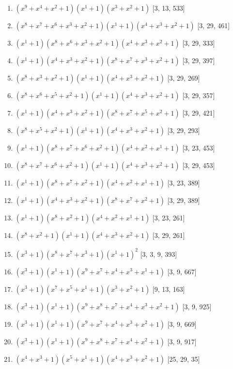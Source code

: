 \documentclass[10pt,twocolumn]{article}
\begin{document}
\begin{enumerate}
\item $(x^{9} + x^{4} + x^{2} + 1)(x^{1} + 1)(x^{3} + x^{2} + 1)$  [3, 13, 533]
\item $(x^{8} + x^{7} + x^{6} + x^{3} + x^{2} + 1)(x^{1} + 1)(x^{4} + x^{3} + x^{2} + 1)$  [3, 29, 461]
\item $(x^{1} + 1)(x^{8} + x^{6} + x^{3} + x^{2} + 1)(x^{4} + x^{3} + x^{2} + 1)$  [3, 29, 333]
\item $(x^{1} + 1)(x^{4} + x^{3} + x^{2} + 1)(x^{8} + x^{7} + x^{3} + x^{2} + 1)$  [3, 29, 397]
\item $(x^{8} + x^{3} + x^{2} + 1)(x^{1} + 1)(x^{4} + x^{3} + x^{2} + 1)$  [3, 29, 269]
\item $(x^{8} + x^{6} + x^{5} + x^{2} + 1)(x^{1} + 1)(x^{4} + x^{3} + x^{2} + 1)$  [3, 29, 357]
\item $(x^{1} + 1)(x^{4} + x^{3} + x^{2} + 1)(x^{8} + x^{7} + x^{5} + x^{2} + 1)$  [3, 29, 421]
\item $(x^{8} + x^{5} + x^{2} + 1)(x^{1} + 1)(x^{4} + x^{3} + x^{2} + 1)$  [3, 29, 293]
\item $(x^{1} + 1)(x^{8} + x^{7} + x^{6} + x^{2} + 1)(x^{4} + x^{2} + x^{1} + 1)$  [3, 23, 453]
\item $(x^{8} + x^{7} + x^{6} + x^{2} + 1)(x^{1} + 1)(x^{4} + x^{3} + x^{2} + 1)$  [3, 29, 453]
\item $(x^{1} + 1)(x^{8} + x^{7} + x^{2} + 1)(x^{4} + x^{2} + x^{1} + 1)$  [3, 23, 389]
\item $(x^{1} + 1)(x^{4} + x^{3} + x^{2} + 1)(x^{8} + x^{7} + x^{2} + 1)$  [3, 29, 389]
\item $(x^{1} + 1)(x^{8} + x^{2} + 1)(x^{4} + x^{2} + x^{1} + 1)$  [3, 23, 261]
\item $(x^{8} + x^{2} + 1)(x^{1} + 1)(x^{4} + x^{3} + x^{2} + 1)$  [3, 29, 261]
\item $(x^{3} + 1)(x^{8} + x^{7} + x^{3} + 1)(x^{1} + 1)^{2}$  [3, 3, 9, 393]
\item $(x^{3} + 1)(x^{1} + 1)(x^{9} + x^{7} + x^{4} + x^{3} + x^{1} + 1)$  [3, 9, 667]
\item $(x^{3} + 1)(x^{7} + x^{5} + x^{1} + 1)(x^{3} + x^{2} + 1)$  [9, 13, 163]
\item $(x^{3} + 1)(x^{1} + 1)(x^{9} + x^{8} + x^{7} + x^{4} + x^{3} + x^{2} + 1)$  [3, 9, 925]
\item $(x^{3} + 1)(x^{1} + 1)(x^{9} + x^{7} + x^{4} + x^{3} + x^{2} + 1)$  [3, 9, 669]
\item $(x^{3} + 1)(x^{1} + 1)(x^{9} + x^{8} + x^{7} + x^{4} + x^{2} + 1)$  [3, 9, 917]
\item $(x^{4} + x^{3} + 1)(x^{5} + x^{1} + 1)(x^{4} + x^{3} + x^{2} + 1)$  [25, 29, 35]

\end{enumerate}
\end{document}

